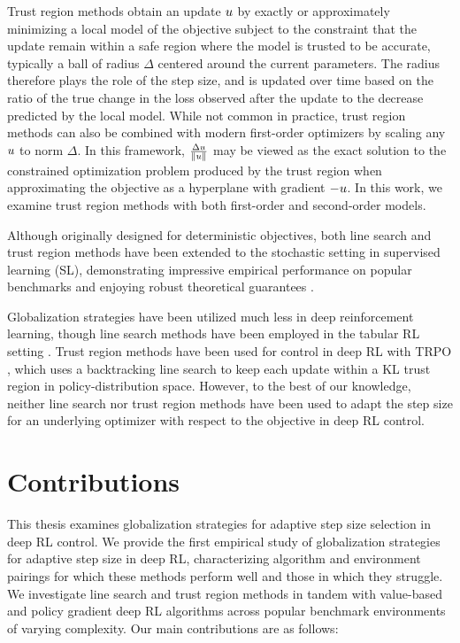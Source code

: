 Trust region methods obtain an update $u$ by exactly or approximately minimizing a local model of the objective subject to the constraint that the update remain within a safe region where the model is trusted to be accurate, typically a ball of radius $\Delta$ centered around the current parameters. The radius therefore plays the role of the step size, and is updated over time based on the ratio of the true change in the loss observed after the update to the decrease predicted by the local model. While not common in practice, trust region methods can also be combined with modern first-order optimizers by scaling any $u$ to norm $\Delta$. In this framework, $\frac{\Delta u}{\left \lVert u \right \rVert}$ may be viewed as the exact solution to the constrained optimization problem produced by the trust region when approximating the objective as a hyperplane with gradient $-u$. In this work, we examine trust region methods with both first-order and second-order models. 

Although originally designed for deterministic objectives, both line search and trust region methods have been extended to the stochastic setting in supervised learning (SL), demonstrating impressive empirical performance on popular benchmarks and enjoying robust theoretical guarantees \cite{lu2024towards,vaswani2019painless,galli2023monotone,shea2024so,vaswani2020adaptive,fox2024glocal,vaswani2025armijo,fan2023bisls,jiang2023adaptive}.

Globalization strategies have been utilized much less in deep reinforcement learning, though line search methods have been employed in the tabular RL setting . Trust region methods have been used for control in deep RL with TRPO \cite{schulman2015trust}, which uses a backtracking line search to keep each update within a KL trust region in policy-distribution space. However, to the best of our knowledge, neither line search nor trust region methods have been used to adapt the step size for an underlying optimizer with respect to the objective in deep RL control.

\section{Contributions}
This thesis examines globalization strategies for adaptive step size selection in deep RL control. We provide the first empirical study of globalization strategies for adaptive step size in deep RL, characterizing algorithm and environment pairings for which these methods perform well and those in which they struggle. We investigate line search and trust region methods in tandem with value-based and policy gradient deep RL algorithms across popular benchmark environments of varying complexity. Our main contributions are as follows:

